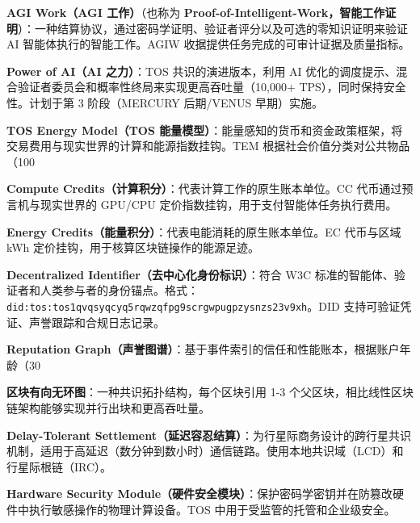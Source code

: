 \documentclass[11pt]{article}
\begin{document}
\begin{description}[leftmargin=3cm, style=nextline]
  \item[AGIW (PoIW)] \textbf{AGI Work（AGI 工作）}（也称为 \textbf{Proof-of-Intelligent-Work，智能工作证明}）：一种结算协议，通过密码学证明、验证者评分以及可选的零知识证明来验证 AI 智能体执行的智能工作。AGIW 收据提供任务完成的可审计证据及质量指标。

  \item[PAI] \textbf{Power of AI（AI 之力）}：TOS 共识的演进版本，利用 AI 优化的调度提示、混合验证者委员会和概率性终局来实现更高吞吐量（10,000+ TPS），同时保持安全性。计划于第 3 阶段（MERCURY 后期/VENUS 早期）实施。

  \item[TEM] \textbf{TOS Energy Model（TOS 能量模型）}：能量感知的货币和资金政策框架，将交易费用与现实世界的计算和能源指数挂钩。TEM 根据社会价值分类对公共物品（100%

  \item[CC] \textbf{Compute Credits（计算积分）}：代表计算工作的原生账本单位。CC 代币通过预言机与现实世界的 GPU/CPU 定价指数挂钩，用于支付智能体任务执行费用。

  \item[EC] \textbf{Energy Credits（能量积分）}：代表电能消耗的原生账本单位。EC 代币与区域 kWh 定价挂钩，用于核算区块链操作的能源足迹。

  \item[DID] \textbf{Decentralized Identifier（去中心化身份标识）}：符合 W3C 标准的智能体、验证者和人类参与者的身份锚点。格式：\texttt{did:tos:tos1qvqsyqcyq5rqwzqfpg9scrgwpugpzysnzs23v9xh}。DID 支持可验证凭证、声誉跟踪和合规日志记录。

  \item[RepGraph] \textbf{Reputation Graph（声誉图谱）}：基于事件索引的信任和性能账本，根据账户年龄（30%

  \item[BlockDAG] \textbf{区块有向无环图}：一种共识拓扑结构，每个区块引用 1-3 个父区块，相比线性区块链架构能够实现并行出块和更高吞吐量。

  \item[DT-Settlement] \textbf{Delay-Tolerant Settlement（延迟容忍结算）}：为行星际商务设计的跨行星共识机制，适用于高延迟（数分钟到数小时）通信链路。使用本地共识域（LCD）和行星际根链（IRC）。

  \item[HSM] \textbf{Hardware Security Module（硬件安全模块）}：保护密码学密钥并在防篡改硬件中执行敏感操作的物理计算设备。TOS 中用于受监管的托管和企业级安全。


\end{description}
\end{document}
